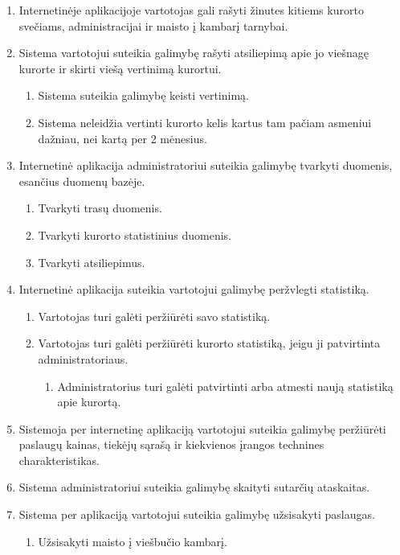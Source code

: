 \documentclass[oneside]{VUMIFPSkursinis}
\begin{document}
\begin{enumerate}
\begin{enumerate}
\begin{enumerate}
		\end{enumerate}
	\end{enumerate}
	\item Internetinėje aplikacijoje vartotojas gali rašyti žinutes kitiems kurorto svečiams, administracijai ir maisto į kambarį tarnybai.
	\item Sistema vartotojui suteikia galimybę rašyti atsiliepimą apie jo viešnagę kurorte ir skirti viešą vertinimą kurortui.
	\begin{enumerate}
		\item Sistema suteikia galimybę keisti vertinimą.
		\item Sistema neleidžia vertinti kurorto kelis kartus tam pačiam asmeniui dažniau, nei kartą per 2 mėnesius.
	\end{enumerate}
	\item Internetinė aplikacija administratoriui suteikia galimybę tvarkyti duomenis, esančius duomenų bazėje.
	\begin{enumerate}
		\item Tvarkyti trasų duomenis.
		\item Tvarkyti kurorto statistinius duomenis.
		\item Tvarkyti atsiliepimus.
	\end{enumerate}
	\item Internetinė aplikacija suteikia vartotojui galimybę peržvlegti statistiką.
	\begin{enumerate}
		\item Vartotojas turi galėti peržiūrėti savo statistiką.
		\item Vartotojas turi galėti peržiūrėti kurorto statistiką, jeigu ji patvirtinta administratoriaus.
		\begin{enumerate}
			\item Administratorius turi galėti patvirtinti arba atmesti naują statistiką apie kurortą.
		\end{enumerate}
	\end{enumerate}
	\item Sistemoja per internetinę aplikaciją vartotojui suteikia galimybę peržiūrėti paslaugų kainas, tiekėjų sąrašą ir kiekvienos įrangos technines charakteristikas.
	\item Sistema administratoriui suteikia galimybę skaityti sutarčių ataskaitas.
	\item Sistema per aplikaciją vartotojui suteikia galimybę užsisakyti paslaugas.
	\begin{enumerate}
		\item Užsisakyti maisto į viešbučio kambarį.

\end{enumerate}
\end{enumerate}
\end{document}
